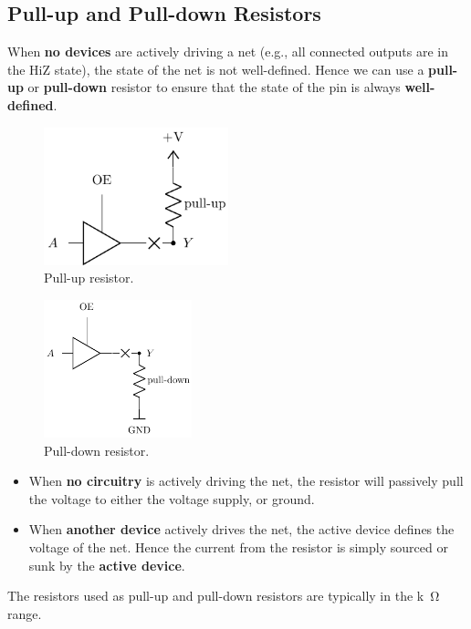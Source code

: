 \documentclass[a4paper]{report}
\begin{document}
\subsection{Pull-up and Pull-down Resistors}
When \textbf{no devices} are actively driving a net (e.g., all connected outputs are in the HiZ state),
the state of the net is not well-defined. Hence we can use a \textbf{pull-up} or \textbf{pull-down} resistor
to ensure that the state of the pin is always \textbf{well-defined}.
\begin{multicols}{2}
    \begin{figure}[H]
        \centering
        \includegraphics[height = 4cm, keepaspectratio = true]{figures/pullup_resistor.pdf}
        \caption{Pull-up resistor.} %
    \end{figure}
    \begin{figure}[H]
        \centering
        \includegraphics[height = 4cm, keepaspectratio = true]{figures/pulldown_resistor.pdf}
        \caption{Pull-down resistor.} %
    \end{figure}
\end{multicols}
\begin{itemize}
    \item When \textbf{no circuitry} is actively driving the net, the resistor will passively pull the voltage to either the voltage supply, or ground.
    \item When \textbf{another device} actively drives the net, the active device defines the voltage of the net. Hence the current from the resistor is simply sourced
          or sunk by the \textbf{active device}.
\end{itemize}
The resistors used as pull-up and pull-down resistors are typically in the \unit{k\ohm} range.
\end{document}
